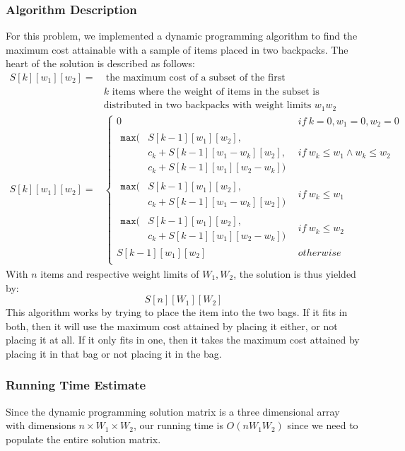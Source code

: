 \documentclass{math}
\begin{document}
\subsubsection*{Algorithm Description}
For this problem, we implemented a dynamic programming algorithm to find the
maximum cost attainable with a sample of items placed in two backpacks. The
heart of the solution is described as follows:
\begin{align*}
  S[k][w_1][w_2] =& ~\text{the maximum cost of a subset of the first } \\
  & k \text{ items where the weight of items in the subset is} \\
  & \text{distributed in two backpacks with weight limits } w_1w_2 \\[3em]
  S[k][w_1][w_2] =& \begin{cases}
    0 & if~k = 0, w_1 = 0, w_2 = 0 \\[1em]
    \begin{aligned}
      \texttt{max}(&S[k-1][w_1][w_2], \\
      & c_k+S[k-1][w_1-w_k][w_2], \\
      & c_k+S[k-1][w_1][w_2-w_k])
    \end{aligned} & if~w_k\le w_1\wedge w_k\le w_2 \\[2em]
    \begin{aligned}
      \texttt{max}(&S[k-1][w_1][w_2], \\
      & c_k+S[k-1][w_1-w_k][w_2])
    \end{aligned} & if~w_k\le w_1 \\[2em]
    \begin{aligned}
      \texttt{max}(&S[k-1][w_1][w_2], \\
      & c_k+S[k-1][w_1][w_2-w_k])
    \end{aligned} & if~w_k\le w_2 \\[2em]
    S[k-1][w_1][w_2] & otherwise \\
  \end{cases}
\end{align*}
With \( n \) items and respective weight limits of \( W_1,W_2 \), the solution
is thus yielded by:
\[ S[n][W_1][W_2] \]
This algorithm works by trying to place the item into the two bags. If it fits
in both, then it will use the maximum cost attained by placing it either, or
not placing it at all. If it only fits in one, then it takes the maximum cost
attained by placing it in that bag or not placing it in the bag.

\subsubsection*{Running Time Estimate}
Since the dynamic programming solution matrix is a three dimensional array with
dimensions \( n\times W_1\times W_2 \), our running time is \( O(nW_1W_2) \)
since we need to populate the entire solution matrix.
\end{document}
